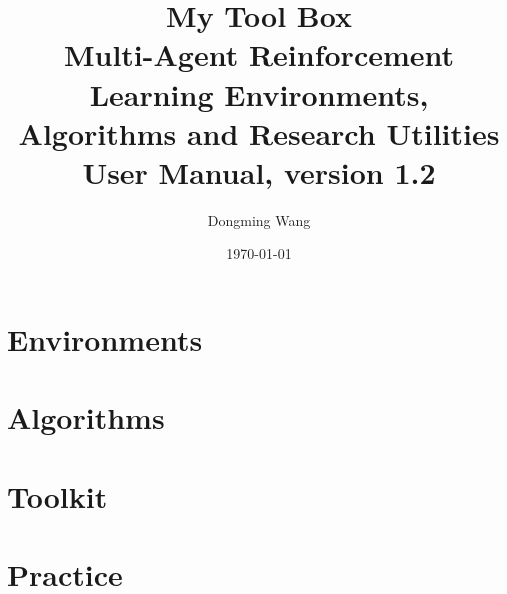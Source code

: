 \documentclass[11pt,a4paper,oneside]{book}
\title{%
  {\Huge\bfseries My Tool Box}\\[0.6cm]
  {\Large Multi-Agent Reinforcement Learning Environments,\\ Algorithms and Research Utilities}\\[0.8cm]
  {\large User Manual, version 1.2}
}
\author{Dongming Wang}
\date{\today}
\begin{document}
\frontmatter
\hypersetup{pageanchor=false}
\maketitle
\hypersetup{pageanchor=true}
\tableofcontents

\mainmatter



\part{Environments}










\part{Algorithms}


\part{Toolkit}




\part{Practice}



\appendix


\end{document}
